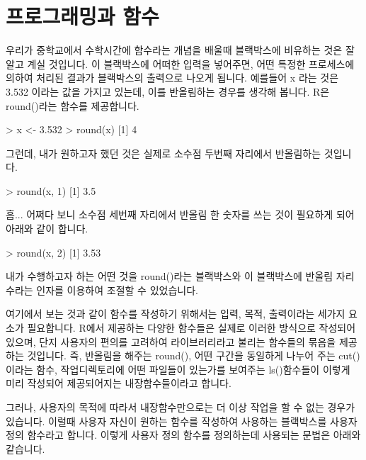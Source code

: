 \section{프로그래밍과 함수}

우리가 중학교에서 수학시간에 함수라는 개념을 배울때 블랙박스에 비유하는 것은 잘 알고 계실 것입니다. 
이 블랙박스에 어떠한 입력을 넣어주면, 어떤 특정한 프로세스에 의하여 처리된 결과가 블랙박스의 출력으로 나오게 됩니다. 
예를들어 x 라는 것은 3.532 이라는 값을 가지고 있는데, 이를 반올림하는 경우를 생각해 봅니다.
R은 round()라는 함수를 제공합니다. 

\begin{Schunk}
\begin{Soutput}
> x <- 3.532
> round(x)
[1] 4
\end{Soutput}
\end{Schunk}

그런데, 내가 원하고자 했던 것은 실제로 소수점 두번째 자리에서 반올림하는 것입니다. 

\begin{Schunk}
\begin{Soutput}
> round(x, 1)
[1] 3.5
\end{Soutput}
\end{Schunk}

흠... 어쩌다 보니 소수점 세번째 자리에서 반올림 한 숫자를 쓰는 것이 필요하게 되어 아래와 같이 합니다.

\begin{Schunk}
\begin{Soutput}
> round(x, 2)
[1] 3.53
\end{Soutput}
\end{Schunk}

내가 수행하고자 하는 어떤 것을 round()라는 블랙박스와 이 블랙박스에 반올림 자리수라는 인자를 이용하여 조절할 수 있었습니다. 

여기에서 보는 것과 같이 함수를 작성하기 위해서는 입력, 목적, 출력이라는 세가지 요소가 필요합니다. 
R에서 제공하는 다양한 함수들은 실제로 이러한 방식으로 작성되어 있으며, 단지 사용자의 편의를 고려하여 라이브러리라고 불리는 함수들의 묶음을 제공하는 것입니다. 
즉, 반올림을 해주는 round(), 어떤 구간을 동일하게 나누어 주는 cut()이라는 함수, 작업디렉토리에 어떤 파일들이 있는가를 보여주는 ls()함수들이 이렇게 미리 작성되어 제공되어지는 내장함수들이라고 합니다.

그러나, 사용자의 목적에 따라서 내장함수만으로는 더 이상 작업을 할 수 없는 경우가 있습니다.
이럴때 사용자 자신이 원하는 함수를 작성하여 사용하는 블랙박스를 사용자정의 함수라고 합니다.
이렇게 사용자 정의 함수를 정의하는데 사용되는 문법은 아래와 같습니다. 

